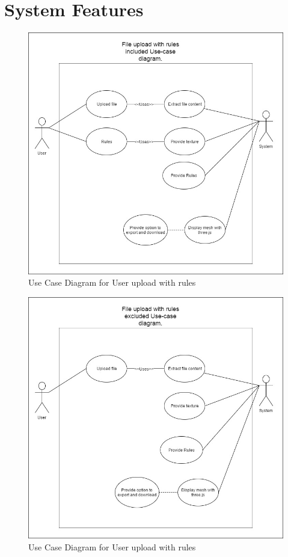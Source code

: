 \documentclass[english]{article}
\begin{document}
	\section{System Features}
		\begin{figure}[h]
			\includegraphics[width=\textwidth]{rules.jpg}
			\caption{Use Case Diagram for User upload with rules }
		\end{figure}
		
		\begin{figure}[h]
			\includegraphics[width=\textwidth]{norules.jpg}
			\caption{Use Case Diagram for User upload with rules }
		\end{figure}
	
\end{document}
